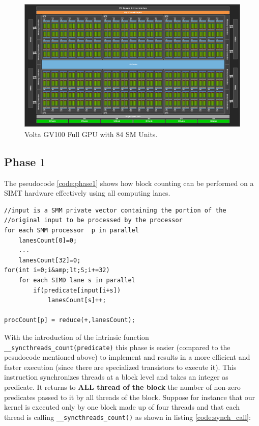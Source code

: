\begin{figure}
	\begin{center}
		\includegraphics[width=1.0\textwidth]{./images/stream_compaction/volta_architecture}
		\caption{ Volta GV100 Full GPU with 84 SM Units.}
		\label{fig:volta_architecture}
	\end{center}
\end{figure}

\subsection{Phase $1$}
The  pseudocode \ref{code:phase1} shows how block counting can be performed on a SIMT hardware effectively using all computing lanes.
\begin{lstlisting}
//input is a SMM private vector containing the portion of the //original input to be processed by the processor
for each SMM processor  p in parallel
	lanesCount[0]=0;
	...
	lanesCount[32]=0;
for(int i=0;i&amp;lt;S;i+=32)
	for each SIMD lane s in parallel
		if(predicate[input[i+s])
			lanesCount[s]++;

procCount[p] = reduce(+,lanesCount);	
\end{lstlisting}

With the introduction of the intrinsic function \texttt{\_\_syncthreads\_count(predicate)} this phase is easier (compared to the pesudocode mentioned above) to implement and results in a more efficient and faster execution (since there are specialized transistors to execute it). This instruction synchronizes threads at a block level and takes an integer as predicate. It returns to \textbf{ALL thread of the block} the number of non-zero predicates passed to it by all threads of the block.
Suppose for instance that our kernel is executed only by one block made up of four threads and that each thread is calling \texttt{\_\_syncthreads\_count()} as shown in listing \ref{code:synch_call}:

